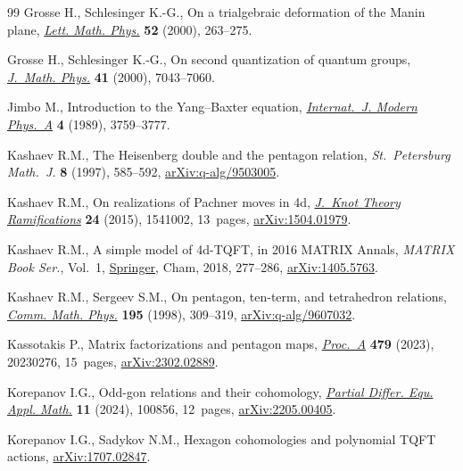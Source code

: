\begin{thebibliography}{99}
Grosse H., Schlesinger K.-G., On a trialgebraic deformation of the {M}anin
 plane, \href{https://doi.org/10.1023/A:1007666919616}{\textit{Lett. Math.
 Phys.}} \textbf{52} (2000), 263--275.

Grosse H., Schlesinger K.-G., On second quantization of quantum groups,
 \href{https://doi.org/10.1063/1.1288798}{\textit{J.~Math. Phys.}} \textbf{41}
 (2000), 7043--7060.

Jimbo M., Introduction to the {Y}ang--{B}axter equation,
 \href{https://doi.org/10.1142/S0217751X89001503}{\textit{Internat.~J. Modern
 Phys.~A}} \textbf{4} (1989), 3759--3777.

Kashaev R.M., The {H}eisenberg double and the pentagon relation,
 \textit{St.~Petersburg Math.~J.} \textbf{8} (1997), 585--592,
 \href{https://arxiv.org/abs/q-alg/9503005}{arXiv:q-alg/9503005}.

Kashaev R.M., On realizations of {P}achner moves in 4d,
 \href{https://doi.org/10.1142/S0218216515410023}{\textit{J.~Knot Theory
 Ramifications}} \textbf{24} (2015), 1541002, 13~pages,
 \href{https://arxiv.org/abs/1504.01979}{arXiv:1504.01979}.

Kashaev R.M., A simple model of 4d-{TQFT}, in 2016 {MATRIX} Annals,
 \textit{MATRIX Book Ser.}, Vol.~1,
 \href{https://doi.org/10.1007/978-3-319-72299-3_14}{Springer}, Cham, 2018,
 277--286, \href{https://arxiv.org/abs/1405.5763}{arXiv:1405.5763}.

Kashaev R.M., Sergeev S.M., On pentagon, ten-term, and tetrahedron relations,
 \href{https://doi.org/10.1007/s002200050391}{\textit{Comm. Math. Phys.}}
 \textbf{195} (1998), 309--319,
 \href{https://arxiv.org/abs/q-alg/9607032}{arXiv:q-alg/9607032}.

Kassotakis P., Matrix factorizations and pentagon maps,
 \href{https://doi.org/10.1098/rspa.2023.0276}{\textit{Proc.~A}} \textbf{479}
 (2023), 20230276, 15~pages,
 \href{https://arxiv.org/abs/2302.02889}{arXiv:2302.02889}.

Korepanov I.G., Odd-gon relations and their cohomology, \href{https://doi.org/10.1016/j.padiff.2024.100856}{\textit{Partial Differ. Equ. Appl. Math.}} \textbf{11} (2024), 100856, 12~pages,
 \href{https://arxiv.org/abs/2205.00405}{arXiv:2205.00405}.

Korepanov I.G., Sadykov N.M., Hexagon cohomologies and polynomial {TQFT}
 actions, \href{https://arxiv.org/abs/1707.02847}{arXiv:1707.02847}.


\end{thebibliography}
